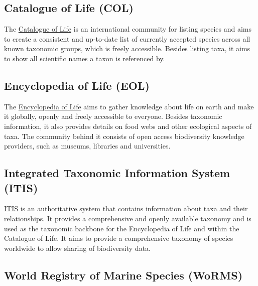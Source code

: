 \documentclass[
]{book}
\begin{document}
\hypertarget{catalogue-of-life-col}{%
\subsection{Catalogue of Life (COL)}\label{catalogue-of-life-col}}

The \href{https://www.catalogueoflife.org/}{Catalogue of Life} is an international community for listing species and aims to create a consistent and up-to-date list of currently accepted species across all known taxonomic groups, which is freely accessible. Besides listing taxa, it aims to show all scientific names a taxon is referenced by.

\hypertarget{encyclopedia-of-life-eol}{%
\subsection{Encyclopedia of Life (EOL)}\label{encyclopedia-of-life-eol}}

The \href{https://www.eol.org/}{Encyclopedia of Life} aims to gather knowledge about life on earth and make it globally, openly and freely accessible to everyone. Besides taxonomic information, it also provides details on food webs and other ecological aspects of taxa. The community behind it consists of open access biodiversity knowledge providers, such as museums, libraries and universities.

\hypertarget{integrated-taxonomic-information-system-itis}{%
\subsection{Integrated Taxonomic Information System (ITIS)}\label{integrated-taxonomic-information-system-itis}}

\href{https://www.itis.gov/}{ITIS} is an authoritative system that contains information about taxa and their relationships. It provides a comprehensive and openly available taxonomy and is used as the taxonomic backbone for the Encyclopedia of Life and within the Catalogue of Life. It aims to provide a comprehensive taxonomy of species worldwide to allow sharing of biodiversity data.

\hypertarget{world-registry-of-marine-species-worms}{%
\subsection{World Registry of Marine Species (WoRMS)}\label{world-registry-of-marine-species-worms}}
\end{document}
